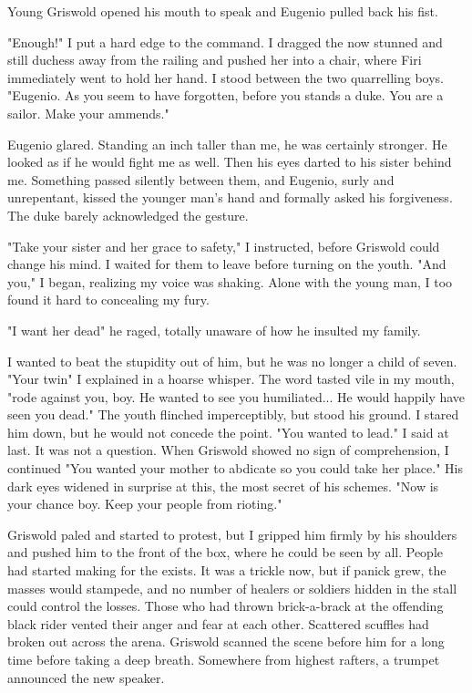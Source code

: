 \documentclass{article}
\begin{document}
Young Griswold opened his mouth to speak and Eugenio pulled back his fist.

"Enough!" I put a hard edge to the command. I dragged the now stunned and still duchess away from the railing and pushed her into a chair, where Firi immediately went to hold her hand. I stood between the two quarrelling boys. "Eugenio. As you seem to have forgotten, before you stands a duke. You are a sailor. Make your ammends."

Eugenio glared. Standing an inch taller than me, he was certainly stronger. He looked as if he would fight me as well. Then his eyes darted to his sister behind me. Something passed silently between them, and Eugenio, surly and unrepentant, kissed the younger man's hand and formally asked his forgiveness. The duke barely acknowledged the gesture.

"Take your sister and her grace to safety," I instructed, before Griswold could change his mind. I waited for them to leave before turning on the youth. "And you," I began, realizing my voice was shaking. Alone with the young man, I too found it hard to concealing my fury.

"I want her dead" he raged, totally unaware of how he insulted my family.

I wanted to beat the stupidity out of him, but he was no longer a child of seven. "Your twin" I explained in a hoarse whisper. The word tasted vile in my mouth, "rode against you, boy. He wanted to see you humiliated... He would happily have seen you dead." The youth flinched imperceptibly, but stood his ground. I stared him down, but he would not concede the point. "You wanted to lead." I said at last. It was not a question. When Griswold showed no sign of comprehension, I continued "You wanted your mother to abdicate so you could take her place." His dark eyes widened in surprise at this, the most secret of his schemes. "Now is your chance boy. Keep your people from rioting."

Griswold paled and started to protest, but I gripped him firmly by his shoulders and pushed him to the front of the box, where he could be seen by all. People had started making for the exists. It was a trickle now, but if panick grew, the masses would stampede, and no number of healers or soldiers hidden in the stall could control the losses. Those who had thrown brick-a-brack at the offending black rider vented their anger and fear at each other. Scattered scuffles had broken out across the arena. Griswold scanned the scene before him for a long time before taking a deep breath. Somewhere from highest rafters, a trumpet announced the new speaker.
\end{document}
